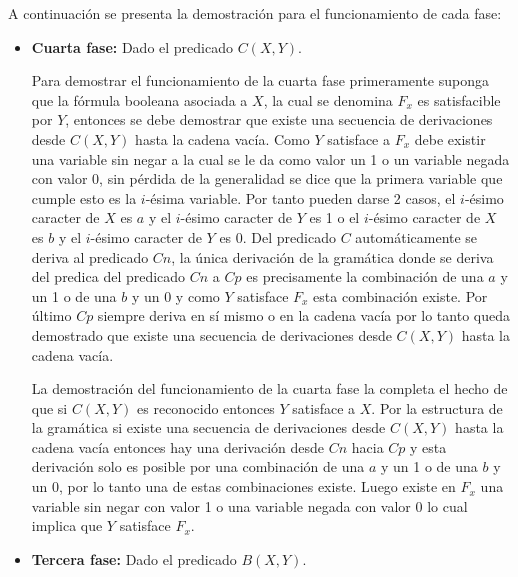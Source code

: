 \documentclass[12pt]{article}
\begin{document}
A continuación se presenta la demostración para el funcionamiento de cada fase:

\begin{itemize}
    \item \textbf{Cuarta fase:} Dado el predicado $C(X,Y)$.

          Para demostrar el funcionamiento de la cuarta fase primeramente suponga que la fórmula booleana asociada a $X$, la
          cual se denomina $F_x$ es satisfacible por $Y$, entonces se debe demostrar que existe una secuencia de
          derivaciones desde $C(X,Y)$ hasta la cadena vacía. Como $Y$ satisface a $F_x$ debe existir una variable sin negar a
          la cual se le da como valor un 1 o un variable negada con valor 0, sin pérdida de la generalidad se dice que
          la primera variable que cumple esto es la $i$-ésima variable. Por tanto pueden darse 2 casos, el $i$-ésimo caracter de $X$ es $a$ y el $i$-ésimo caracter de
          $Y$ es 1 o el $i$-ésimo caracter de $X$ es $b$ y el $i$-ésimo caracter de $Y$ es 0. Del predicado $C$ automáticamente
          se deriva al predicado $Cn$, la única derivación de la gramática donde se deriva del predica del predicado $Cn$ a $Cp$
          es precisamente la combinación de una $a$ y un 1 o de una $b$ y un 0 y como $Y$ satisface $F_x$ esta combinación existe. Por último
          $Cp$ siempre deriva en sí mismo o en la cadena vacía por lo tanto queda demostrado que existe una secuencia de derivaciones
          desde $C(X,Y)$ hasta la cadena vacía.

          La demostración del funcionamiento de la cuarta fase la completa el hecho de que si $C(X,Y)$ es reconocido entonces
          $Y$ satisface a $X$. Por la estructura de la gramática si existe una secuencia de derivaciones desde $C(X,Y)$ hasta la cadena
          vacía entonces hay una derivación desde $Cn$ hacia $Cp$ y esta derivación solo es posible por una combinación de una $a$ y un 1
          o de una $b$ y un 0, por lo tanto una de estas combinaciones existe. Luego existe en $F_x$ una variable sin negar con valor 1 o una variable
          negada con valor 0 lo cual implica que $Y$ satisface $F_x$.

    \item \textbf{Tercera fase:} Dado el predicado $B(X,Y)$.


\end{itemize}
\end{document}
